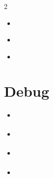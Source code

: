 \begin{multicols}{2}
\begin{itemize}

 \item \autocite{mai:kong2019computationalthinking}
 \item \autocite{mai:kong2022ctk12ailiteracy}
 \item \autocite{mai:abelson2024ctk12curricula}

\end{itemize}

\section{Debug}

\begin{itemize}

 \item \autocite{cybeprotest}
 \item \autocite{web}
 \item \autocite{sep-set-theory}
 \item \autocite{link:CiteDrive2022}

\end{itemize}

\end{multicols}

\printbibliography


